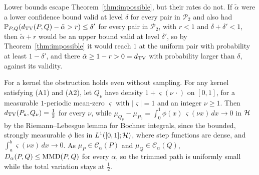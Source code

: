 Lower bounds escape Theorem~\ref{thm:impossible}, but their rates do not. If $\tilde\alpha$ were a lower confidence
bound valid at level $\delta$ for every pair in $\mathcal P_2$ and also had
$\mathbb{P}_{P,Q}(d_{\mathrm{TV}}(P,Q)-\tilde\alpha>r)\le\delta'$ for every pair in $\mathcal P_2$, with $r<1$ and $\delta+\delta'<1$,
then $\tilde\alpha+r$ would be an upper bound valid at level $\delta'$, so by Theorem~\ref{thm:impossible} it would
reach $1$ at the uniform pair with probability at least $1-\delta'$, and there $\tilde\alpha\ge1-r>0=d_{\mathrm{TV}}$ with
probability larger than $\delta$, against its validity.

For a kernel the obstruction holds even without sampling. For any kernel satisfying (A1) and (A2), let $Q_\nu$ have
density $1+\varsigma(\nu\,\cdot)$ on $[0,1]$, for a measurable $1$-periodic mean-zero $\varsigma$ with $|\varsigma|=1$ and
an integer $\nu\ge1$. Then $d_{\mathrm{TV}}(P_{\mathrm u},Q_\nu)=\tfrac12$ for every $\nu$, while $\mu_{Q_\nu}-\mu_{P_{\mathrm u}}=\int_0^1\phi(x)\,
\varsigma(\nu x)\,dx\to0$ in $\mathcal{H}$ by the Riemann--Lebesgue lemma for Bochner integrals, since the bounded, strongly
measurable $\phi$ lies in $L^1([0,1];\mathcal{H})$, where step functions are dense, and $\int_a^b\varsigma(\nu x)\,dx\to0$. As
$\mu_P\in\mathcal C_\alpha(P)$ and $\mu_Q\in\mathcal C_\alpha(Q)$, $D_\alpha(P,Q)\le\operatorname{MMD}(P,Q)$ for every $\alpha$, so the
trimmed path is uniformly small while the total variation stays at $\tfrac12$.
